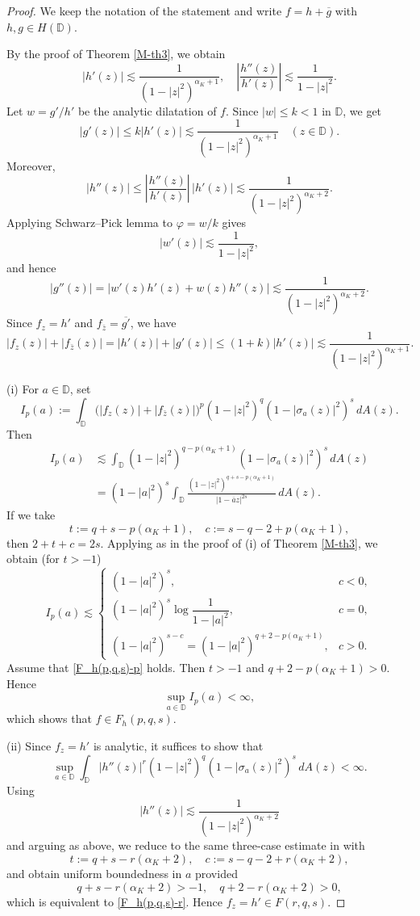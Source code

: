 \documentclass[12pt, reqno]{amsart}
\begin{document}
\begin{proof}
We keep the notation of the statement and write $f=h+\overline g$ with $h,g\in H(\mathbb D)$.

By the proof of Theorem \ref{M-th3}, we obtain
\[
|h'(z)|\lesssim \frac{1}{(1-|z|^2)^{\alpha_K+1}},
\quad
\left|\frac{h''(z)}{h'(z)}\right|\lesssim \frac{1}{1-|z|^2}.
\]
Let $w={g'}/{h'}$ be the analytic dilatation of $f$. Since $|w|\le k<1$ in $\mathbb D$, we get
\[
|g'(z)|\le k|h'(z)|\lesssim \frac{1}{(1-|z|^2)^{\alpha_K+1}}\quad (z\in\mathbb D).
\]
Moreover,
\[
|h''(z)|\le \left|\frac{h''(z)}{h'(z)}\right|\,|h'(z)|
\lesssim \frac{1}{(1-|z|^2)^{\alpha_K+2}}.
\]
Applying Schwarz--Pick lemma to $\varphi={w}/{k}$ gives $$|w'(z)|\lesssim \frac{1}{1-|z|^2},$$ and hence
\[
|g''(z)|
=|w'(z)h'(z)+w(z)h''(z)|
\lesssim \frac{1}{(1-|z|^2)^{\alpha_K+2}}.
\]
Since $f_z=h'$ and $f_{\bar z}=\overline{g'}$, we have
\[
|f_z(z)|+|f_{\bar z}(z)|
=|h'(z)|+|g'(z)|
\le (1+k)|h'(z)|
\lesssim \frac{1}{(1-|z|^2)^{\alpha_K+1}}.
\]

\medskip
{(i)} For $a\in\mathbb D$, set
\[
I_p(a):=\int_{\mathbb D}\bigl(|f_z(z)|+|f_{\bar z}(z)|\bigr)^p(1-|z|^2)^q(1-|\sigma_a(z)|^2)^s\,dA(z).
\]
Then
\begin{align*}
I_p(a)
&\lesssim \int_{\mathbb D}(1-|z|^2)^{q-p(\alpha_K+1)}(1-|\sigma_a(z)|^2)^s\,dA(z)\\
&= (1-|a|^2)^s\int_{\mathbb D}\frac{(1-|z|^2)^{q+s-p(\alpha_K+1)}}{|1-\overline a z|^{2s}}\,dA(z).
\end{align*}
If we take
\[
t:=q+s-p(\alpha_K+1),\quad c:=s-q-2+p(\alpha_K+1),
\]
then $2+t+c=2s$. Applying \cite[Lemma 3.10]{ZK} as in the proof of (i) of Theorem \ref{M-th3}, we obtain (for $t>-1$)
\[
I_p(a)\lesssim
\begin{cases}
(1-|a|^2)^s, & c<0,\\[1mm]
(1-|a|^2)^s\log\!\dfrac{1}{1-|a|^2}, & c=0,\\[2mm]
(1-|a|^2)^{s-c}=(1-|a|^2)^{q+2-p(\alpha_K+1)}, & c>0.
\end{cases}
\]
Assume that \eqref{F_h(p,q,s)-p} holds. Then $t>-1$ and $q+2-p(\alpha_K+1)>0$. Hence $$\sup\limits_{a\in\mathbb D}I_p(a)<\infty,$$
which shows that $f\in F_h(p,q,s)$.

\medskip
{(ii)} Since $f_z=h'$ is analytic, it suffices to show that
\[
\sup_{a\in\mathbb D}\int_{\mathbb D}|h''(z)|^r(1-|z|^2)^q(1-|\sigma_a(z)|^2)^s\,dA(z)<\infty.
\]
Using $$|h''(z)|\lesssim \frac{1}{(1-|z|^2)^{\alpha_K+2}}$$ and arguing as above, we reduce to the same three-case estimate in \cite[Lemma 3.10]{ZK} with
\[
t:=q+s-r(\alpha_K+2),\quad c:=s-q-2+r(\alpha_K+2),
\]
and obtain uniform boundedness in $a$ provided
\[
q+s-r(\alpha_K+2)>-1,\quad q+2-r(\alpha_K+2)>0,
\]
which is equivalent to \eqref{F_h(p,q,s)-r}. Hence $f_z=h'\in F(r,q,s)$.


\end{proof}
\end{document}
